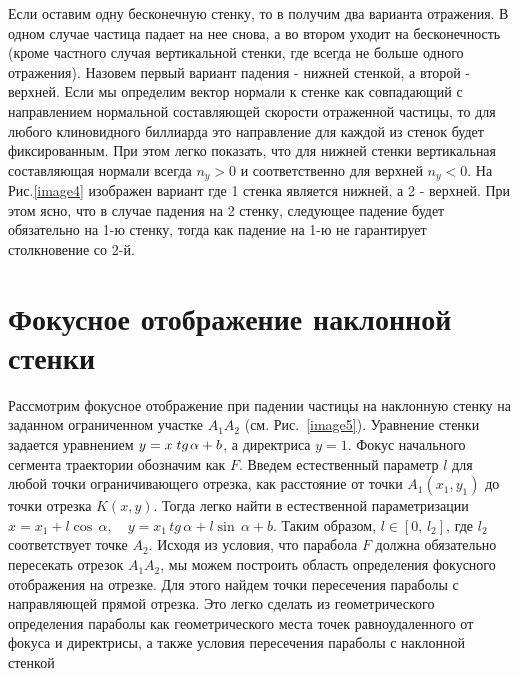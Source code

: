 \documentclass[a4paper]{article}
\begin{document}
 Если оставим одну бесконечную стенку, то в получим два варианта отражения. В одном случае частица   падает на нее снова, а во втором уходит на бесконечность (кроме частного случая вертикальной стенки, где всегда не больше одного отражения).
 Назовем первый вариант падения - нижней стенкой, а второй - верхней. Если мы определим вектор нормали к стенке как совпадающий с направлением нормальной составляющей скорости отраженной частицы, то для любого клиновидного биллиарда это направление для каждой из стенок будет фиксированным. При этом легко показать, что для нижней стенки вертикальная составляющая нормали всегда $n_y>0$ и соответственно для верхней $n_y<0$. На  Рис.\ref{image4} изображен вариант где 1 стенка является нижней, а 2 - верхней. При этом ясно, что в случае падения на 2 стенку, следующее падение будет обязательно на 1-ю стенку, тогда как падение на 1-ю не гарантирует столкновение со 2-й.


\section{Фокусное отображение наклонной стенки}

Рассмотрим фокусное отображение при падении частицы на наклонную стенку на заданном ограниченном участке $A_{1} A_{2} $ (см. Рис.~\ref{image5}). Уравнение стенки задается уравнением $y=x\; tg{\kern 1pt} \alpha +b$, а директриса $y=1$. Фокус начального сегмента траектории обозначим как $F$. Введем естественный параметр $l$ для любой точки ограничивающего отрезка, как расстояние от точки $A_{1} \left(x_{1} ,y_{1} \right)$ до точки отрезка $K\left(x,y\right)$. Тогда легко найти в естественной параметризации $x=x_{1} +l\cos \, \alpha ,\quad y=x_{1} \, tg\, \alpha +l\sin \, \alpha +b$. Таким образом, $l\in \left[0,\, l_{2} \right]$, где $l_{2} $ соответствует точке $A_{2} $. Исходя из условия, что парабола $F$ должна обязательно пересекать отрезок $A_{1} A_{2} $, мы можем построить область определения фокусного отображения на отрезке. Для этого найдем точки пересечения параболы с направляющей прямой отрезка. Это легко сделать из геометрического определения параболы как геометрического места точек равноудаленного от фокуса и директрисы, а также условия пересечения параболы с наклонной стенкой
\end{document}
